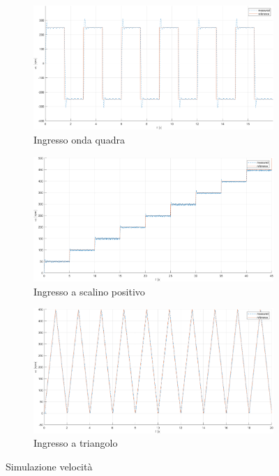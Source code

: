 \documentclass[a4paper, 11pt]{article}
\begin{document}
\begin{figure}[H]
    \centering
    \begin{subfigure}{0.45\linewidth}
        \centering
        \includegraphics[width=\linewidth]{./Images/MioPadre.png}
        \caption{Ingresso onda quadra}
        \label{Lab1:Square}
    \end{subfigure}
    \hfill
    \begin{subfigure}{0.45\linewidth}
        \centering
        \includegraphics[width=\linewidth]{./Images/MioPadre2.png}
        \caption{Ingresso a scalino positivo}
        \label{Lab1:Stair}
    \end{subfigure}
    \hfill
    \begin{subfigure}{0.45\linewidth}
        \centering
        \includegraphics[width=\linewidth]{./Images/MioPadre3.png}
        \caption{Ingresso a triangolo}
        \label{Lab1:Triang}
    \end{subfigure}
    \caption{Simulazione velocità}
\end{figure}
\end{document}
